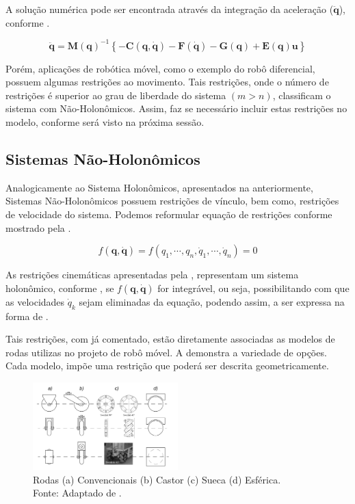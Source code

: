 A solução numérica pode ser encontrada através da integração da aceleração ($\mathbf{\ddot{q}}$), conforme .

\begin{equation}
   \mathbf{\ddot{q}}=\mathbf{M(q)}^{-1}\left\{\mathbf{-C(q, \dot{q})-F(\dot{q})-G(q) + E(q)u}\right\}
   \label{eq:accel}
\end{equation}

Porém, aplicações de robótica móvel, como o exemplo do robô diferencial, possuem algumas restrições ao movimento. Tais restrições, onde o número de restrições é superior ao grau de liberdade do sistema $(m>n)$, classificam o sistema com Não-Holonômicos. Assim, faz se necessário incluir estas restrições no modelo, conforme será visto na próxima sessão.

\subsection{Sistemas Não-Holonômicos}

Analogicamente ao Sistema Holonômicos, apresentados na anteriormente, Sistemas Não-Holonômicos possuem restrições de vínculo, bem como, restrições de velocidade do sistema. Podemos reformular equação de restrições conforme mostrado pela .

\begin{equation}
    f(\mathbf{q}, \dot{\mathbf{q}}) = f(q_1, \cdots, q_n, \dot{q}_1, \cdots, \dot{q}_n) = 0
    \label{eq:nonhomo}
\end{equation}

As restrições cinemáticas apresentadas pela , representam um sistema holonômico, conforme \cite{klancar2017wheeled}, se $f(\mathbf{q}, \dot{\mathbf{q}})$ for integrável, ou seja, possibilitando com que as velocidades $\dot{q}_k$ sejam eliminadas da equação, podendo assim, a  ser expressa na forma de .

Tais restrições, com já comentado, estão diretamente associadas as modelos de rodas utilizas no projeto de robô móvel. A  demonstra a variedade de opções. Cada modelo, impõe uma restrição que poderá ser descrita geometricamente.

\begin{figure}[!ht]
    \centering
    \includegraphics[width=0.5\textwidth]{chapters/chapter1/figures/tipo_de_rodas.png}
    \caption{Rodas (a) Convencionais (b) Castor (c) Sueca (d) Esférica. \\
    Fonte: Adaptado de \cite{klancar2017wheeled}.}
    \label{fig:rodas}
\end{figure}

